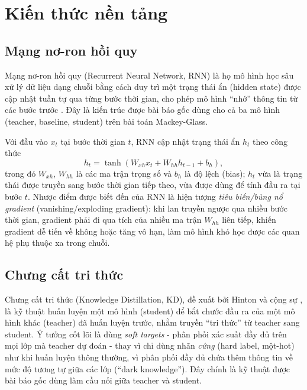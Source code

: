 \chapter{Kiến thức nền tảng}
\label{chuong:nentang}

\section{Mạng nơ-ron hồi quy}
\label{sec:rnn}

Mạng nơ-ron hồi quy (Recurrent Neural Network, RNN) là họ mô hình học sâu xử lý dữ liệu dạng
chuỗi bằng cách duy trì một trạng thái ẩn (hidden state) được cập nhật tuần tự qua từng bước
thời gian, cho phép mô hình ``nhớ'' thông tin từ các bước trước \cite{elman1990rnn}. Đây là
kiến trúc được bài báo gốc dùng cho cả ba mô hình (teacher, baseline, student) trên bài toán
Mackey-Glass.

Với đầu vào $x_t$ tại bước thời gian $t$, RNN cập nhật trạng thái ẩn $h_t$ theo công thức
\begin{equation}
	h_t = \tanh\!\left(W_{xh} x_t + W_{hh} h_{t-1} + b_h\right),
	\label{eq:rnn}
\end{equation}
trong đó $W_{xh}$, $W_{hh}$ là các ma trận trọng số và $b_h$ là độ lệch (bias); $h_t$ vừa là
trạng thái được truyền sang bước thời gian tiếp theo, vừa được dùng để tính đầu ra tại bước
$t$. Nhược điểm được biết đến của RNN là hiện tượng \textit{tiêu biến/bùng nổ gradient}
(vanishing/exploding gradient): khi lan truyền ngược qua nhiều bước thời gian, gradient phải đi
qua tích của nhiều ma trận $W_{hh}$ liên tiếp, khiến gradient dễ tiến về không hoặc tăng vô
hạn, làm mô hình khó học được các quan hệ phụ thuộc xa trong chuỗi.

\section{Chưng cất tri thức}
\label{sec:kd}

Chưng cất tri thức (Knowledge Distillation, KD), đề xuất bởi Hinton và cộng sự
\cite{hinton2015distillation}, là kỹ thuật huấn luyện một mô hình (student) để bắt chước đầu
ra của một mô hình khác (teacher) đã huấn luyện trước, nhằm truyền ``tri thức'' từ teacher
sang student. Ý tưởng cốt lõi là dùng \textit{soft targets} - phân phối xác suất đầy đủ trên
mọi lớp mà teacher dự đoán - thay vì chỉ dùng nhãn \textit{cứng} (hard label, một-hot) như
khi huấn luyện thông thường, vì phân phối đầy đủ chứa thêm thông tin về mức độ tương tự giữa
các lớp (``dark knowledge''). Đây chính là kỹ thuật được bài báo gốc dùng làm cầu nối giữa
teacher và student.

